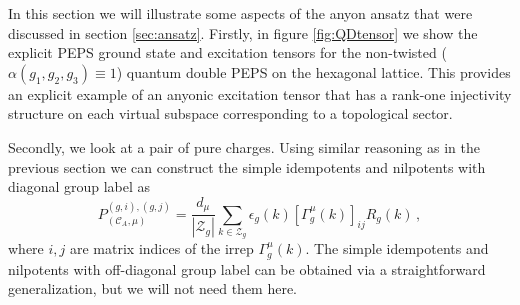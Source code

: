 \documentclass[12 pt]{article}
\begin{document}
In this section we will illustrate some aspects of the anyon ansatz that were discussed in section \ref{sec:ansatz}. Firstly, in figure \ref{fig:QDtensor} we show the explicit PEPS ground state and excitation tensors for the non-twisted ($\alpha(g_1,g_2,g_3)\equiv 1$) quantum double PEPS on the hexagonal lattice. This provides an explicit example of an anyonic excitation tensor that has a rank-one injectivity structure on each virtual subspace corresponding to a topological sector. 


Secondly, we look at a pair of pure charges. Using similar reasoning as in the previous section we can construct the simple idempotents and nilpotents with diagonal group label as
\begin{equation}
P_{(\mathcal{C}_A,\mu)}^{(g,i),(g,j)} =  \frac{d_\mu}{|\mathcal{Z}_g|}\sum_{k\in\mathcal{Z}_g} \epsilon_g(k) [\Gamma^\mu_g(k)]_{ij}R_g(k)\, ,
\end{equation}
where $i,j$ are matrix indices of the irrep $\Gamma^\mu_g(k)$. The simple idempotents and nilpotents with off-diagonal group label can be obtained via a straightforward generalization, but we will not need them here.
\end{document}
